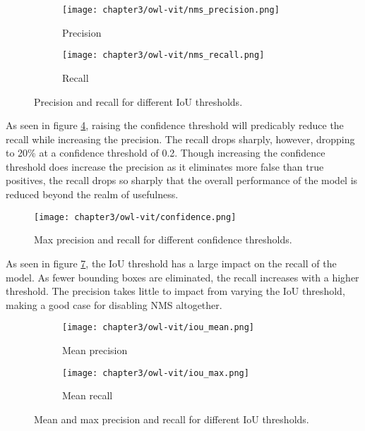 \begin{figure}[h]
    \begin{adjustwidth}{-1in}{-1in}
        \centering
        \begin{subfigure}[b]{0.45\paperwidth}
            \texttt{[image: chapter3/owl-vit/nms\_precision.png]}
            \caption{Precision}
            \label{fig:3_nms_precision}
        \end{subfigure}
        \begin{subfigure}[b]{0.45\paperwidth}
            \texttt{[image: chapter3/owl-vit/nms\_recall.png]}
            \caption{Recall}
            \label{fig:3_nms_recall}
        \end{subfigure}
    \end{adjustwidth}
    \caption{Precision and recall for different IoU thresholds.}
    \label{fig:3_nms}
\end{figure}

As seen in figure \ref{fig:3_confidence}, raising the confidence threshold will predicably reduce the recall while increasing the precision. The recall drops sharply, however, dropping to 20\% at a confidence threshold of 0.2. Though increasing the confidence threshold does increase the precision as it eliminates more false than true positives, the recall drops so sharply that the overall performance of the model is reduced beyond the realm of usefulness.

\begin{figure}[h]
    \centering
    \texttt{[image: chapter3/owl-vit/confidence.png]}
    \caption{Max precision and recall for different confidence thresholds.}
    \label{fig:3_confidence}
\end{figure}

As seen in figure \ref{fig:3_iou_mean_max}, the IoU threshold has a large impact on the recall of the model. As fewer bounding boxes are eliminated, the recall increases with a higher threshold. The precision takes little to impact from varying the IoU threshold, making a good case for disabling NMS altogether.

\begin{figure}[h]
    \begin{adjustwidth}{-1in}{-1in}
        \centering
        \begin{subfigure}[b]{0.45\paperwidth}
            \texttt{[image: chapter3/owl-vit/iou\_mean.png]}
            \caption{Mean precision}
            \label{fig:3_iou_mean_precision}
        \end{subfigure}
        \begin{subfigure}[b]{0.45\paperwidth}
            \texttt{[image: chapter3/owl-vit/iou\_max.png]}
            \caption{Mean recall}
            \label{fig:3_iou_mean_recall}
        \end{subfigure}
    \end{adjustwidth}
    \caption{Mean and max precision and recall for different IoU thresholds.}
    \label{fig:3_iou_mean_max}
\end{figure}

